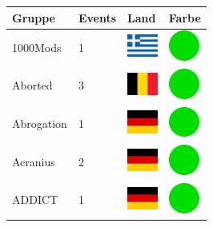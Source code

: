 \documentclass[12pt, a4paper, twoside]{report}
\begin{document}
	\begin{center}
		\begin{longtable}{|p{5cm}|p{2cm}|p{2cm}|p{2cm}|} 
			
			\hline
			\rowcolor{lightgray} Gruppe & Events & Land & Farbe \\ \hline
			\endhead
			1000Mods & 1 & \includegraphics[width=1cm]{4x3/gr} & \includegraphics[width=1cm]{likes/y} \\ \hline
			Aborted & 3 & \includegraphics[width=1cm]{4x3/be} & \includegraphics[width=1cm]{likes/y} \\ \hline
			Abrogation & 1 & \includegraphics[width=1cm]{4x3/de} & \includegraphics[width=1cm]{likes/y} \\ \hline
			Acranius & 2 & \includegraphics[width=1cm]{4x3/de} & \includegraphics[width=1cm]{likes/y} \\ \hline
			ADDICT & 1 & \includegraphics[width=1cm]{4x3/de} & \includegraphics[width=1cm]{likes/y} \\ \hline

\end{longtable}
\end{center}
\end{document}

